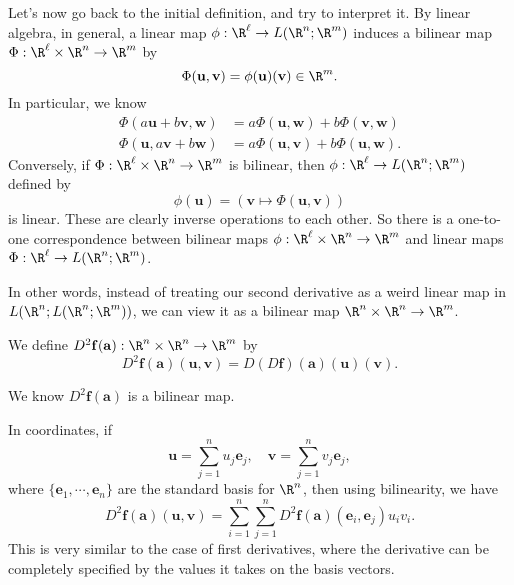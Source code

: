 \documentclass[a4paper]{article}
\begin{document}
Let's now go back to the initial definition, and try to interpret it. By linear algebra, in general, a linear map $\phi: \R^\ell \to L(\R^n; \R^m)$ induces a bilinear map $\Phi: \R^\ell \times \R^n \to \R^m$ by
\[
  \Phi(\mathbf{u}, \mathbf{v}) = \phi(\mathbf{u})(\mathbf{v}) \in \R^m.
\]
In particular, we know
\begin{align*}
  \Phi(a \mathbf{u} + b \mathbf{v}, \mathbf{w}) &= a \Phi(\mathbf{u}, \mathbf{w}) + b \Phi(\mathbf{v}, \mathbf{w})\\
  \Phi(\mathbf{u}, a \mathbf{v} + b \mathbf{w}) &= a \Phi(\mathbf{u}, \mathbf{v}) + b \Phi(\mathbf{u}, \mathbf{w}).
\end{align*}
Conversely, if $\Phi: \R^\ell \times \R^n \to \R^m$ is bilinear, then $\phi: \R^\ell \to L(\R^n; \R^m)$ defined by
\[
  \phi(\mathbf{u}) = (\mathbf{v} \mapsto \Phi(\mathbf{u}, \mathbf{v}))
\]
is linear. These are clearly inverse operations to each other. So there is a one-to-one correspondence between bilinear maps $\phi: \R^\ell \times \R^n \to \R^m$ and linear maps $\Phi: \R^\ell \to L(\R^n; \R^m)$.

In other words, instead of treating our second derivative as a weird linear map in $L(\R^n; L(\R^n; \R^m))$, we can view it as a bilinear map $\R^n \times \R^n \to \R^m$.
\begin{notation}
  We define $D^2 \mathbf{f}(\mathbf{a}) : \R^n \times \R^n \to \R^m$ by
  \[
    D^2 \mathbf{f}(\mathbf{a}) (\mathbf{u}, \mathbf{v}) = D(D \mathbf{f})(\mathbf{a})(\mathbf{u})(\mathbf{v}).
  \]
\end{notation}
We know $D^2 \mathbf{f}(\mathbf{a})$ is a bilinear map.

In coordinates, if
\[
  \mathbf{u} = \sum_{j = 1}^n u_j \mathbf{e}_j,\quad \mathbf{v} = \sum_{j = 1}^n v_j \mathbf{e}_j,
\]
where $\{\mathbf{e}_1, \cdots, \mathbf{e}_n\}$ are the standard basis for $\R^n$, then using bilinearity, we have
\[
  D^2 \mathbf{f}(\mathbf{a})(\mathbf{u}, \mathbf{v}) = \sum_{i = 1}^n \sum_{j = 1}^n D^2 \mathbf{f}(\mathbf{a}) (\mathbf{e}_i, \mathbf{e}_j) u_i v_i.
\]
This is very similar to the case of first derivatives, where the derivative can be completely specified by the values it takes on the basis vectors.
\end{document}
